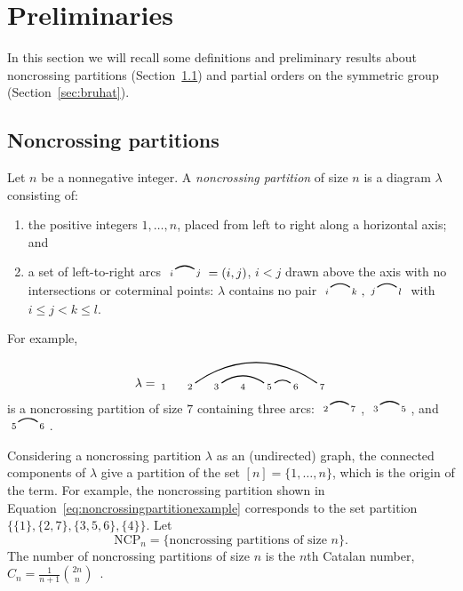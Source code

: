 \documentclass[12pt]{amsart}
\theoremstyle{definition}
\theoremstyle{remark}
\numberwithin{equation}{section}
\newcommand{\NCP}{\mathrm{NCP}}
\newcommand{\edge}[2]{\tikz[scale = 0.75, baseline = -0.2cm]{
\draw (0.1, 0) node[inner sep = 0ex] (a) {};
\node[left, xshift = 0.1cm, yshift = -0.1cm] at (a) {$\scriptstyle #1$};
\draw (0.9, 0)  node[inner sep = 0ex] (b) {};
\node[right, xshift = -0.1cm, yshift = -0.1cm] at (b) {$\scriptstyle #2$};
\draw[thick] (a) to[out = 35, in = 145] (b);}}
\begin{document}
\section{Preliminaries}

In this section we will recall some definitions and preliminary results about noncrossing partitions (Section~\ref{sec:ncp}) and partial orders on the symmetric group (Section~\ref{sec:bruhat}).

\subsection{Noncrossing partitions}
\label{sec:ncp}

Let $n$ be a nonnegative integer.  A \emph{noncrossing partition} of size $n$ is a diagram $\lambda$ consisting of:
\begin{enumerate}
\item the positive integers $1, \ldots, n$, placed from left to right along a horizontal axis; and

\item a set of left-to-right arcs $\edge{i}{j} = (i, j)$, $i < j$ drawn above the axis with no intersections or coterminal points: $\lambda$ contains no pair $\edge{i}{k}, \edge{j}{l}$ with $i \le j < k \le l$.

\end{enumerate}
For example,
\begin{equation}
\label{eq:noncrossingpartitionexample}
\lambda = \begin{tikzpicture}[scale = 0.75, baseline = 0.75*-0.2]
\foreach \x in {1, ..., 7}{\draw[fill] (\x - 1, 0) node[inner sep = 2pt] (\x) {$\scriptstyle \x$};}
\foreach \i\j in {5/6, 3/5,2/7}{\draw[thick] (\i) to[out = 35, in = 145] (\j);}
\end{tikzpicture}
\end{equation}
is a noncrossing partition of size $7$ containing three arcs: $\edge{2}{7}$, $\edge{3}{5}$, and $\edge{5}{6}$.

Considering a noncrossing partition $\lambda$ as an (undirected) graph, the connected components of $\lambda$ give a partition of the set $[n] = \{1, \ldots, n\}$, which is the origin of the term.  For example, the noncrossing partition shown in Equation~\eqref{eq:noncrossingpartitionexample} corresponds to the set partition $\{ \{1\}, \{2, 7\}, \{3, 5, 6\}, \{4\}  \}$.  Let
\[
\NCP_{n} = \{ \text{noncrossing partitions of size $n$} \}.
\]
The number of noncrossing partitions of size $n$ is the $n$th Catalan number, $C_{n} = \frac{1}{n+1}\binom{2n}{n}$~\cite[Exercise 6.19 pp]{Stanley}.
\end{document}
